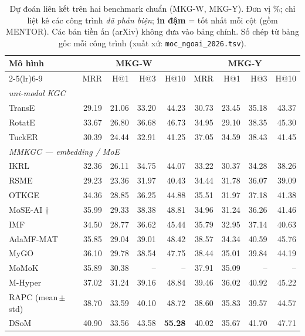 \begin{table}[t]
\centering
\footnotesize
\setlength{\tabcolsep}{5pt}
\caption{Dự đoán liên kết trên hai benchmark chuẩn (MKG-W, MKG-Y). Đơn vị \%; chỉ liệt kê các công trình \emph{đã phản biện}; \textbf{in đậm} = tốt nhất mỗi cột (gồm MENTOR). Các bản tiền ấn (arXiv) không đưa vào bảng chính. Số chép từ bảng gốc mỗi công trình (xuất xứ: \texttt{moc\_ngoai\_2026.tsv}).}
\label{tab:main}
\begin{tabular}{l r r r r r r r r}
\toprule
\multirow{2}{*}{Mô hình} & \multicolumn{4}{c}{MKG-W} & \multicolumn{4}{c}{MKG-Y} \\
\cmidrule(lr){2-5}\cmidrule(lr){6-9}
 & MRR & H@1 & H@3 & H@10 & MRR & H@1 & H@3 & H@10 \\
\midrule
\multicolumn{9}{l}{\itshape uni-modal KGC} \\
TransE & 29.19 & 21.06 & 33.20 & 44.23 & 30.73 & 23.45 & 35.18 & 43.37 \\
RotatE & 33.67 & 26.80 & 36.68 & 46.73 & 34.95 & 29.10 & 38.35 & 45.30 \\
TuckER & 30.39 & 24.44 & 32.91 & 41.25 & 37.05 & 34.59 & 38.43 & 41.45 \\
\multicolumn{9}{l}{\itshape MMKGC — embedding / MoE} \\
IKRL & 32.36 & 26.11 & 34.75 & 44.07 & 33.22 & 30.37 & 34.28 & 38.26 \\
RSME & 29.23 & 23.36 & 31.97 & 40.43 & 34.44 & 31.78 & 36.07 & 39.09 \\
OTKGE & 34.36 & 28.85 & 36.25 & 44.88 & 35.51 & 31.97 & 37.18 & 41.38 \\
MoSE-AI † & 35.99 & 29.33 & 38.38 & 48.81 & 34.96 & 31.24 & 36.26 & 41.46 \\
IMF & 34.50 & 28.77 & 36.62 & 45.44 & 35.79 & 32.95 & 37.14 & 40.63 \\
AdaMF-MAT & 35.85 & 29.04 & 39.01 & 48.42 & 38.57 & 34.34 & 40.59 & 45.76 \\
MyGO & 36.10 & 29.78 & 38.54 & 47.75 & 38.44 & 35.01 & 39.84 & 44.19 \\
MoMoK & 35.89 & 30.38 & -- & -- & 37.91 & 35.09 & -- & -- \\
M-Hyper & 37.02 & 31.24 & 39.16 & 48.84 & 39.46 & 36.02 & 40.92 & 45.22 \\
RAPC (mean\,$\pm$\,std) & 38.70 & 33.59 & 40.10 & 48.72 & 38.60 & 35.83 & 39.57 & 44.57 \\
DSoM & 40.90 & 33.56 & 43.58 & \textbf{55.28} & 40.02 & 35.67 & 41.70 & 47.71 \\

\end{tabular}
\end{table}
